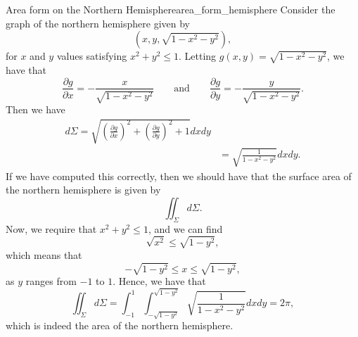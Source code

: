                                      \begin{ex}{Area form on the Northern Hemisphere}{area_form_hemisphere}
                                     	Consider the graph of the northern hemisphere given by 
                                     	\[
                                     	(x,y,\sqrt{1-x^2-y^2}),
                                     	\]
                                     	for $x$ and $y$ values satisfying $x^2+y^2\leq 1$.  Letting $g(x,y)=\sqrt{1-x^2-y^2}$, we have that
                                     	\[
                                     	\frac{\partial g}{\partial x} = -\frac{x}{\sqrt{1-x^2-y^2}} \qquad \textrm{and} \qquad \frac{\partial g}{\partial y} = -\frac{y}{\sqrt{1-x^2-y^2}}.
                                     	\]
                                     	Then we have
                                     	\begin{align*}
	                                     	d\Sigma = \sqrt{\left(\frac{\partial g}{\partial x}\right)^2 + \left(\frac{\partial g}{\partial y}\right)^2 + 1 }dxdy\\
	                                     	&=\sqrt{\frac{1}{1-x^2-y^2}}dxdy.
                                     	\end{align*}
                                     	If we have computed this correctly, then we should have that the surface area of the northern hemisphere is given by
                                     	\[
                                     	\iint_\Sigma d\Sigma.
                                     	\]
                                     	Now, we require that $x^2+y^2\leq 1$, and we can find
                                     	\[
                                     	\sqrt{x^2}\leq \sqrt{1-y^2},
                                     	\]
                                     	which means that
                                     	\[
                                     	-\sqrt{1-y^2}\leq x \leq \sqrt{1-y^2},
                                     	\]
                                     	as $y$ ranges from $-1$ to $1$.  Hence, we have that
                                     	\[
                                     	\iint_\Sigma d\Sigma = \int_{-1}^1 \int_{-\sqrt{1-y^2}}^{\sqrt{1-y^2}} \sqrt{\frac{1}{1-x^2-y^2}}dxdy = 2\pi,
                                     	\]
                                     	which is indeed the area of the northern hemisphere.
                                     \end{ex}
                                     
